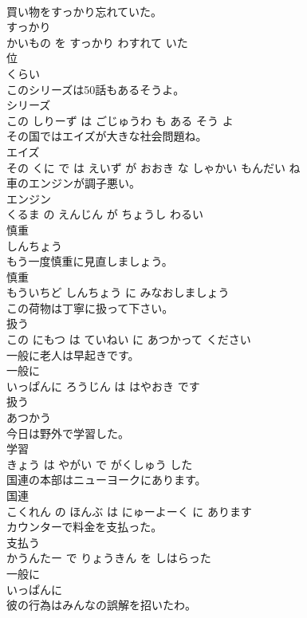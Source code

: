 \documentclass[8pt]{extreport}
\begin{document}
\begin{CJK}{UTF8}{min}
\\	買い物をすっかり忘れていた。	
\\	すっかり 
\\	かいもの を すっかり わすれて いた			
\\	位	
\\	くらい			
\\	このシリーズは50話もあるそうよ。	
\\	シリーズ 
\\	この しりーず は ごじゅうわ も ある そう よ			
\\	その国ではエイズが大きな社会問題ね。	
\\	エイズ 
\\	その くに で は えいず が おおき な しゃかい もんだい ね			
\\	車のエンジンが調子悪い。	
\\	エンジン 
\\	くるま の えんじん が ちょうし わるい			
\\	慎重	
\\	しんちょう		
\\	もう一度慎重に見直しましょう。	
\\	慎重 
\\	もういちど しんちょう に みなおしましょう		
\\	この荷物は丁寧に扱って下さい。	
\\	扱う 
\\	この にもつ は ていねい に あつかって ください		
\\	一般に老人は早起きです。	
\\	一般に 
\\	いっぱんに ろうじん は はやおき です		
\\	扱う	
\\	あつかう		
\\	今日は野外で学習した。	
\\	学習 
\\	きょう は やがい で がくしゅう した		
\\	国連の本部はニューヨークにあります。	
\\	国連 
\\	こくれん の ほんぶ は にゅーよーく に あります		
\\	カウンターで料金を支払った。	
\\	支払う 
\\	かうんたー で りょうきん を しはらった		
\\	一般に	
\\	いっぱんに		
\\	彼の行為はみんなの誤解を招いたわ。	

\end{CJK}
\end{document}
